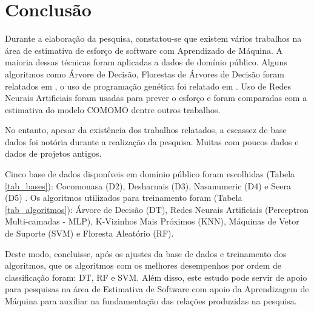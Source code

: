 \documentclass[12pt]{article}
\begin{document}
\section{Conclusão}\label{sec:figs}

Durante a elaboração da pesquisa, constatou-se que existem vários trabalhos na área de estimativa de esforço de software com Aprendizado de Máquina. A maioria dessas técnicas foram aplicadas a dados de domínio público. Alguns algoritmos como Árvore de Decisão, Florestas de Árvores de Decisão foram relatados em \cite{nassifetal:2013}, o uso de programação genética foi relatado em \cite{chavoyaetal:2012}. Uso de Redes Neurais Artificiais foram usadas para prever o esforço e foram comparadas com a estimativa do modelo COMOMO \cite{trontoetal:2007,bhatiaattri:2015} dentre outros trabalhos.

No entanto, apesar da existência dos trabalhos relatados, a escassez de base dados foi notória durante a realização da pesquisa. Muitas com poucos dados e dados de projetos antigos.

Cinco base de dados disponíveis em domínio público foram escolhidas (Tabela \ref{tab_bases}): Cocomonasa (D2), Desharnais (D3), Nasanumeric (D4) e Seera (D5) \cite{promise:2005, nasanumeric:2014, seera:2020}. Os algoritmos utilizados para treinamento foram (Tabela \ref{tab_algoritmos}): Árvore de Decisão (DT), Redes Neurais Artificiais (Perceptron Multi-camadas - MLP), K-Vizinhos Mais Próximos (KNN), Máquinas de Vetor de Suporte (SVM) e Floresta Aleatório (RF).

Deste modo, concluisse, após os ajustes da base de dados e treinamento dos algoritmos, que os algoritmos com os melhores desempenhos por ordem de classificação foram: DT, RF e SVM. Além disso, este estudo pode servir de apoio para pesquisas na área de Estimativa de Software com apoio da Aprendizagem de Máquina para auxiliar na fundamentação das relações produzidas na pesquisa.



\end{document}
